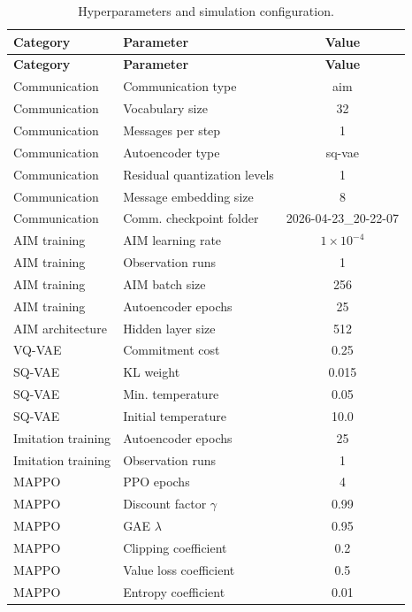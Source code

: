 \label{sec:CONFIG}
{\footnotesize
\begin{longtable}{llc}
    \caption{Hyperparameters and simulation configuration.} \\
    \toprule
    \textbf{Category} & \textbf{Parameter} & \textbf{Value} \\
    \midrule
    \endfirsthead

    \toprule
    \textbf{Category} & \textbf{Parameter} & \textbf{Value} \\
    \midrule
    \endhead

    Communication & Communication type & aim \\
    Communication & Vocabulary size & 32 \\
    Communication & Messages per step & 1 \\
    Communication & Autoencoder type & sq-vae \\
    Communication & Residual quantization levels & 1 \\
    Communication & Message embedding size & 8 \\
    Communication & Comm. checkpoint folder & 2026-04-23\_20-22-07 \\
    \midrule
    AIM training & AIM learning rate & $1\times 10^{-4}$ \\
    AIM training & Observation runs & 1 \\
    AIM training & AIM batch size & 256 \\
    AIM training & Autoencoder epochs & 25 \\
    AIM architecture & Hidden layer size & 512 \\
    VQ-VAE & Commitment cost & 0.25 \\
    SQ-VAE & KL weight & 0.015 \\
    SQ-VAE & Min. temperature & 0.05 \\
    SQ-VAE & Initial temperature & 10.0 \\
    \midrule
    Imitation training & Autoencoder epochs & 25 \\
    Imitation training & Observation runs & 1 \\
    \midrule
    MAPPO & PPO epochs & 4 \\
    MAPPO & Discount factor $\gamma$ & 0.99 \\
    MAPPO & GAE $\lambda$ & 0.95 \\
    MAPPO & Clipping coefficient & 0.2 \\
    MAPPO & Value loss coefficient & 0.5 \\
    MAPPO & Entropy coefficient & 0.01 \\

\end{longtable}}
